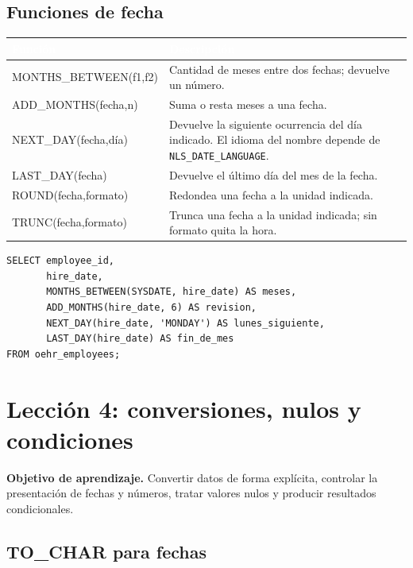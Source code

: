 \documentclass[10pt,letterpaper]{article}
\newenvironment{objetivoleccion}
  {\par\smallskip\noindent\color{tintasql}\small}
  {\par\medskip}
\begin{document}
\subsection{Funciones de fecha}

\begin{longtable}{>{\ttfamily}p{4.5cm} p{10.3cm}}
\toprule
\rowcolor{azulsql}
\normalfont\textcolor{white}{\textbf{Función}} &
\textcolor{white}{\textbf{Descripción}} \\
\midrule
\endhead
MONTHS\_BETWEEN(f1,f2) & Cantidad de meses entre dos fechas; devuelve un número. \\
ADD\_MONTHS(fecha,n) & Suma o resta meses a una fecha. \\
NEXT\_DAY(fecha,día) & Devuelve la siguiente ocurrencia del día indicado. El
idioma del nombre depende de \lstinline|NLS_DATE_LANGUAGE|. \\
LAST\_DAY(fecha) & Devuelve el último día del mes de la fecha. \\
ROUND(fecha,formato) & Redondea una fecha a la unidad indicada. \\
TRUNC(fecha,formato) & Trunca una fecha a la unidad indicada; sin formato quita
la hora. \\
\bottomrule
\end{longtable}

\begin{lstlisting}
SELECT employee_id,
       hire_date,
       MONTHS_BETWEEN(SYSDATE, hire_date) AS meses,
       ADD_MONTHS(hire_date, 6) AS revision,
       NEXT_DAY(hire_date, 'MONDAY') AS lunes_siguiente,
       LAST_DAY(hire_date) AS fin_de_mes
FROM oehr_employees;
\end{lstlisting}

\section{Lección 4: conversiones, nulos y condiciones}

\begin{objetivoleccion}
\textbf{Objetivo de aprendizaje.} Convertir datos de forma explícita, controlar
la presentación de fechas y números, tratar valores nulos y producir resultados
condicionales.
\end{objetivoleccion}

\subsection{TO\_CHAR para fechas}
\end{document}
